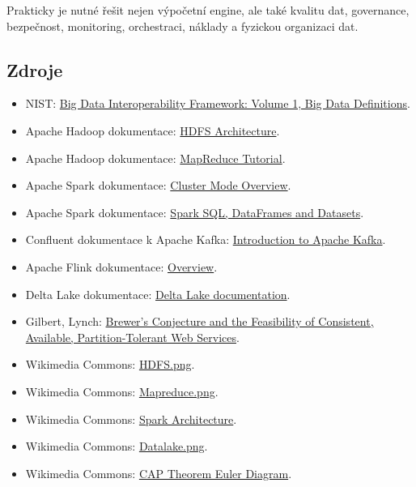 Prakticky je nutné řešit nejen výpočetní engine, ale také kvalitu dat, governance, bezpečnost, monitoring,
orchestraci, náklady a fyzickou organizaci dat.

\subsection{Zdroje}

\begin{itemize}
    \item NIST:
    \href{https://www.nist.gov/publications/nist-big-data-interoperability-framework-volume-1-big-data-definitions-version-2}{Big
    Data Interoperability Framework: Volume 1, Big Data Definitions}.
    \item Apache Hadoop dokumentace:
    \href{https://hadoop.apache.org/docs/r3.3.6/hadoop-project-dist/hadoop-hdfs/HdfsDesign.html}{HDFS
    Architecture}.
    \item Apache Hadoop dokumentace:
    \href{https://hadoop.apache.org/docs/r3.3.6/hadoop-mapreduce-client/hadoop-mapreduce-client-core/MapReduceTutorial.html}{MapReduce
    Tutorial}.
    \item Apache Spark dokumentace:
    \href{https://spark.apache.org/docs/latest/cluster-overview.html}{Cluster Mode Overview}.
    \item Apache Spark dokumentace:
    \href{https://spark.apache.org/docs/latest/sql-programming-guide.html}{Spark SQL, DataFrames and Datasets}.
    \item Confluent dokumentace k Apache Kafka:
    \href{https://docs.confluent.io/kafka/introduction.html}{Introduction to Apache Kafka}.
    \item Apache Flink dokumentace:
    \href{https://nightlies.apache.org/flink/flink-docs-stable/docs/concepts/overview/}{Overview}.
    \item Delta Lake dokumentace:
    \href{https://docs.delta.io/}{Delta Lake documentation}.
    \item Gilbert, Lynch:
    \href{https://groups.csail.mit.edu/tds/papers/Gilbert/Brewer2.pdf}{Brewer's Conjecture and the Feasibility
    of Consistent, Available, Partition-Tolerant Web Services}.
    \item Wikimedia Commons:
    \href{https://commons.wikimedia.org/wiki/File:HDFS.png}{HDFS.png}.
    \item Wikimedia Commons:
    \href{https://commons.wikimedia.org/wiki/File:Mapreduce.png}{Mapreduce.png}.
    \item Wikimedia Commons:
    \href{https://commons.wikimedia.org/wiki/File:Spark\_Architecture.jpg}{Spark Architecture}.
    \item Wikimedia Commons:
    \href{https://commons.wikimedia.org/wiki/File:Datalake.png}{Datalake.png}.
    \item Wikimedia Commons:
    \href{https://commons.wikimedia.org/wiki/File:CAP\_Theorem\_Euler\_Diagram.png}{CAP Theorem Euler Diagram}.
\end{itemize}

\newpage
